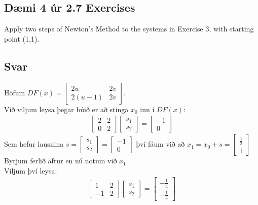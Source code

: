 \documentclass[11pt]{article}
\begin{document}
\subsection*{Dæmi 4 úr 2.7 Exercises}
Apply two steps of Newton’s Method to the systems in Exercise 3, with starting point (1,1).
\subsection*{Svar}
Höfum $DF(x) = \begin{bmatrix}
2u & 2v\\
2(u-1) & 2v
\end{bmatrix}$.\\
Við viljum leysa þegar búið er að stinga $x_0$ inn í $DF(x)$:
\begin{align*}
\begin{bmatrix}
2 & 2\\
0 & 2
\end{bmatrix}
\begin{bmatrix}
s_1\\
s_2
\end{bmatrix}
=
\begin{bmatrix}
-1\\
0
\end{bmatrix}
\end{align*}
Sem hefur lausnina $s=\begin{bmatrix}
s_1\\s_2
\end{bmatrix} = \begin{bmatrix}
-1\\0
\end{bmatrix}$
því fáum við að $x_1 = x_0 +s =\begin{bmatrix}
\frac 12\\1
\end{bmatrix}$\\
Byrjum ferlið aftur en nú notum við $x_1$\\
Viljum því leysa:
\begin{align*}
\begin{bmatrix}
1 & 2\\
-1& 2
\end{bmatrix}
\begin{bmatrix}
s_1\\s_2
\end{bmatrix}
=
\begin{bmatrix}
-\frac 14\\
-\frac 14
\end{bmatrix}
\end{align*}
\end{document}
